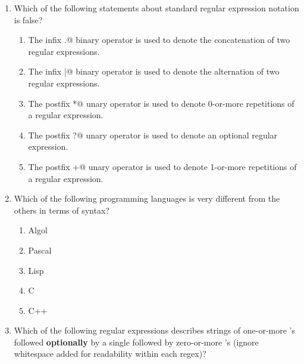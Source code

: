 \documentclass[12pt]{article}
\begin{document}
\begin{enumerate}

\item Which of the following statements about standard regular
  expression notation is false?

\begin{enumerate}

\item The infix \verb@.@ binary operator is used to denote the concatenation
  of two regular expressions.

\item The infix \verb@|@ binary operator is used to denote the alternation
  of two regular expressions.

\item The postfix \verb@*@ unary operator is used to denote 0-or-more
  repetitions of a regular expression.

\item The postfix \verb@?@ unary operator is used to denote an
optional regular expression.

\item The postfix \verb@+@ unary operator is used to denote 1-or-more
  repetitions of a regular expression.
    
\end{enumerate}

\newpage

\item Which of the following programming languages is very different
  from the others in terms of syntax?
\begin{enumerate}

\item Algol

\item Pascal

\item Lisp

\item C

\item C++

\end{enumerate}


\item Which of the following regular expressions describes strings of
  one-or-more \verb@a@'s followed \textbf{optionally} by a single
  \verb@b@ followed by zero-or-more \verb@a@'s (ignore whitespace added
  for readability within each regex)?

\begin{enumerate}


\end{enumerate}
\end{enumerate}
\end{document}
